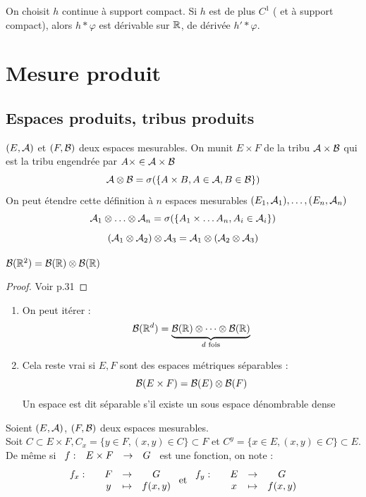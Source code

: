 \documentclass[]{report}
\begin{document}
\begin{ex}
    On choisit $h$ continue à support compact. Si $h$ est de plus $C^1$ ( et à support compact), alors $h\ast\varphi$ est dérivable sur $\mathbb{R}$, de dérivée $h'\ast\varphi$.
\end{ex}

\chapter{Mesure produit}

\section{Espaces produits, tribus produits}

\begin{df}
    $(E,\mathcal{A})$ et $(F,\mathcal{B})$ deux espaces mesurables. On munit $E\times F$ de la tribu $\mathcal{A}\times \mathcal{B}$ qui est la tribu engendrée par $A\times\in \mathcal{A}\times \mathcal{B}$
    \[\mathcal{A}\otimes\mathcal{B}=\sigma(\{A\times B,A\in\mathcal{A},B\in\mathcal{B}\})\]
    On peut étendre cette définition à $n$ espaces mesurables $(E_1,\mathcal{A}_1),\ldots,(E_n,\mathcal{A}_n)$
    \[\mathcal{A}_1\otimes\ldots\otimes\mathcal{A}_n=\sigma(\{A_1\times \ldots A_n,A_i\in\mathcal{A}_i\})\]
    \[(\mathcal{A}_1\otimes\mathcal{A}_2)\otimes\mathcal{A}_3=\mathcal{A}_1\otimes(\mathcal{A}_2\otimes\mathcal{A}_3)\]
\end{df}

\begin{prop}
    $\mathcal{B}(\mathbb{R}^2)=\mathcal{B}(\mathbb{R})\otimes\mathcal{B}(\mathbb{R})$
\end{prop}

\begin{proof}
    Voir p.31
\end{proof}

\begin{re}
    \begin{enumerate}
        \item On peut itérer :
        \[\mathcal{B}(\mathbb{R}^d)=\underset{d\text{ fois}}{\underbrace{\mathcal{B}(\mathbb{R})\otimes\cdots\otimes\mathcal{B}(\mathbb{R})}}\]
        \item Cela reste vrai si $E,F$ sont des espaces métriques séparables :
        \[\mathcal{B}(E\times F)=\mathcal{B}(E)\otimes\mathcal{B}(F)\]
        Un espace est dit séparable s'il existe un sous espace dénombrable dense
    \end{enumerate}
\end{re}

\begin{prop}
    Soient $(E,\mathcal{A})$, $(F,\mathcal{B})$ deux espaces mesurables. \\
    Soit $C\subset E\times F,C_x=\{y\in F,(x,y)\in C\}\subset F$ et $C^y=\{x\in E,(x,y)\in C\}\subset E$.\\
    De même si $\begin{array}{ccccc} f : & E\times F & \to & G \end{array}$ est une fonction, on note :
    \[\begin{array}{ccccc} f_x : & & F & \to & G \\ & & y & \mapsto & f(x,y) \end{array}\text{ et }\begin{array}{ccccc} f_y : & & E & \to & G \\ & & x & \mapsto & f(x,y) \end{array}\]
\end{prop}
\end{document}
